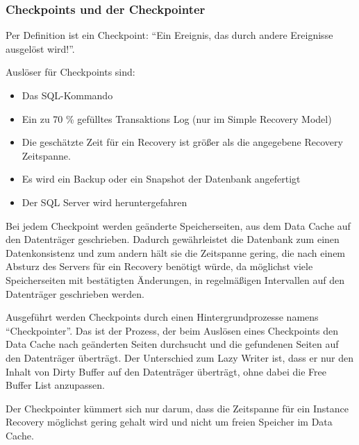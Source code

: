         \subsubsection{Checkpoints und der Checkpointer}
          \begin{merke}
            Per Definition ist ein Checkpoint: \enquote{Ein Ereignis, das durch
            andere Ereignisse ausgelöst wird!}.
          \end{merke}
          Auslöser für Checkpoints sind:
          \begin{itemize}
            \item Das SQL-Kommando 
            \item Ein zu 70 \% gefülltes Transaktions Log (nur im Simple
            Recovery Model)
            \item Die geschätzte Zeit für ein Recovery ist größer als
            die angegebene Recovery Zeit\-spanne.
            \item Es wird ein Backup oder ein Snapshot der Datenbank angefertigt
            \item Der SQL Server wird heruntergefahren
          \end{itemize}
          Bei jedem Checkpoint werden geänderte Speicherseiten, aus dem
          Data Cache auf den Datenträger geschrieben. Dadurch
          gewährleistet die Datenbank zum einen Datenkonsistenz und
          zum andern hält sie die Zeitspanne gering, die nach einem Absturz
          des Servers für ein Recovery benötigt würde, da möglichst
          viele Speicherseiten mit bestätigten Änderungen, in
          regelmäßigen Intervallen auf den Datenträger geschrieben
          werden.
          
          Ausgeführt werden Checkpoints durch einen Hintergrundprozesse
          namens \enquote{Checkpointer}. Das ist der Prozess, der
          beim Auslösen eines Checkpoints den Data Cache nach geänderten Seiten
          durchsucht und die gefundenen Seiten auf den Datenträger überträgt.
          Der Unterschied zum Lazy Writer ist, dass er nur den Inhalt von Dirty
          Buffer auf den Datenträger überträgt, ohne dabei die Free Buffer List
          anzupassen.
          \begin{merke}
            Der Checkpointer kümmert sich nur darum, dass die Zeitspanne für ein
            Instance Recovery möglichst gering gehalt wird und nicht um freien
            Speicher im Data Cache.
          \end{merke}
